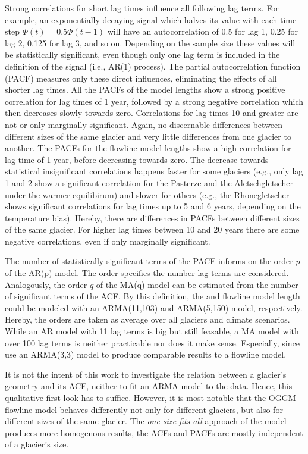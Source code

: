       Strong correlations for short lag times influence all following lag terms. For example, an exponentially decaying signal which halves its value with each time step $\Phi(t) = 0.5 \Phi(t-1)$ will have an autocorrelation of 0.5 for lag 1, 0.25 for lag 2, 0.125 for lag 3, and so on. Depending on the sample size these values will be statistically significant, even though only one lag term is included in the definition of the signal (i.e., AR(1) process). The partial autocorrelation function (PACF) measures only these direct influences, eliminating the effects of all shorter lag times. All the PACFs of the \vas{} model lengths show a strong positive correlation for lag times of 1 year, followed by a strong negative correlation which then decreases slowly towards zero. Correlations for lag times 10 and greater are not or only marginally significant. Again, no discernable differences between different sizes of the same glacier and very little differences from one glacier to another. The PACFs for the flowline model lengths show a high correlation for lag time of 1 year, before decreasing towards zero. The decrease towards statistical insignificant correlations happens faster for some glaciers (e.g., only lag 1 and 2 show a significant correlation for the Pasterze and the Aletschgletscher under the warmer equilibirum) and slower for others (e.g., the Rhonegletscher shows significant correlations for lag times up to 5 and 6 years, depending on the temperature bias). Hereby, there are differences in PACFs between different sizes of the same glacier. For higher lag times between 10 and 20 years there are some negative correlations, even if only marginally significant.

      The number of statistically significant terms of the PACF informs on the order $p$ of the AR(p) model. The order specifies the number lag terms are considered. Analogously, the order $q$ of the MA(q) model can be estimated from the number of significant terms of the ACF. By this definition, the \vas{} and flowline model length could be modeled with an ARMA(11,103) and ARMA(5,150) model, respectively. Hereby, the orders are taken as average over all glaciers and climate scenarios. While an AR model with 11 lag terms is big but still feasable, a MA model with over 100 lag terms is neither practicable nor does it make sense. Especially, since \citet{Roe2014} use an ARMA(3,3) model to produce comparable results to a flowline model.

      It is not the intent of this work to investigate the relation between a glacier's geometry and its ACF, neither to fit an ARMA model to the data. Hence, this qualitative first look has to suffice. However, it is most notable that the OGGM flowline model behaves differently not only for different glaciers, but also for different sizes of the same glacier. The \textit{one size fits all} approach of the \vas{} model produces more homogenous results, the ACFs and PACFs are mostly independent of a glacier's size.

